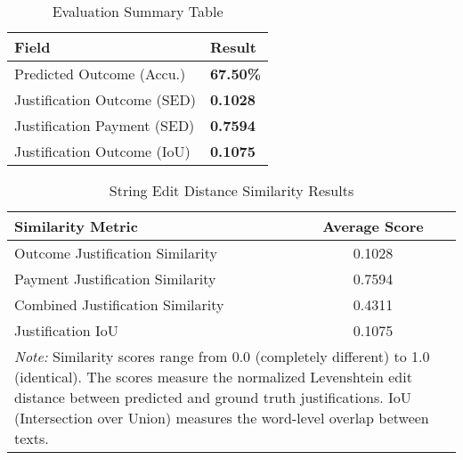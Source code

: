 
\begin{table}[H]
\centering
\caption{Evaluation Summary Table}
\label{tab:evaluation_summary}
\begin{tabular}{@{}lp{2cm}@{}}
\toprule
\textbf{Field} & \textbf{Result} \\
\midrule
Predicted Outcome (Accu.) & \textbf{67.50\%} \\
Justification Outcome (SED) &  \textbf{0.1028} \\
Justification Payment (SED) &  \textbf{0.7594} \\
Justification Outcome (IoU) &  \textbf{0.1075} \\
\bottomrule
\end{tabular}
\end{table}

\begin{table}[!ht]
\centering
\caption{String Edit Distance Similarity Results}
\label{tab:string_edit_distance_results}
\begin{tabular}{lc}
\toprule
\textbf{Similarity Metric} & \textbf{Average Score} \\
\midrule
Outcome Justification Similarity & 0.1028 \\
Payment Justification Similarity & 0.7594 \\
Combined Justification Similarity & 0.4311 \\
Justification IoU & 0.1075 \\
\midrule
\multicolumn{2}{p{13cm}}{\textit{Note:} Similarity scores range from 0.0 (completely different) to 1.0 (identical). 
The scores measure the normalized Levenshtein edit distance between predicted and ground truth justifications.
IoU (Intersection over Union) measures the word-level overlap between texts.} \\
\bottomrule
\end{tabular}
\end{table}

